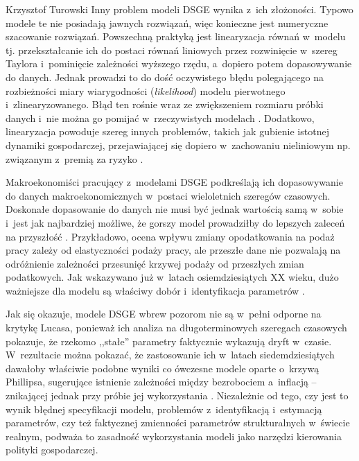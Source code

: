 \begin{artplenv}{Krzysztof Turowski}
Inny problem modeli DSGE wynika z~ich złożoności. Typowo modele te nie posiadają jawnych rozwiązań, więc konieczne jest
numeryczne szacowanie rozwiązań. Powszechną praktyką jest linearyzacja równań w~modelu tj. przekształcanie ich do
postaci równań liniowych przez rozwinięcie w~szereg Taylora i~pominięcie zależności wyższego rzędu, a~dopiero potem
dopasowywanie do danych. Jednak prowadzi to do dość oczywistego błędu polegającego na rozbieżności
miary wiarygodności (\textit{likelihood}) modelu pierwotnego i~zlinearyzowanego. Błąd ten rośnie wraz ze zwiększeniem
rozmiaru próbki danych i~nie można go pomijać w~rzeczywistych modelach
\parencite{fernandezvillaverde_convergence_2006}.
Dodatkowo, linearyzacja powoduje szereg innych problemów, takich jak gubienie istotnej dynamiki
gospodarczej, przejawiającej się dopiero w~zachowaniu nieliniowym np. związanym z~premią za ryzyko
\parencite{dou_macroeconomic_2017}.

Makroekonomiści pracujący z~modelami DSGE podkreślają ich dopasowywanie do danych makroekonomicznych w~postaci
wieloletnich szeregów czasowych. Doskonałe dopasowanie do danych nie musi być jednak wartością samą w~sobie
i~jest jak najbardziej możliwe, że gorszy model prowadziłby do lepszych zaleceń na przyszłość
\parencite{kocherlakota_model_2007}.
Przykładowo, ocena wpływu zmiany opodatkowania na podaż pracy zależy od
elastyczności podaży pracy, ale przeszłe dane nie pozwalają na odróżnienie zależności przesunięć krzywej podaży od
przeszłych zmian podatkowych. Jak wskazywano już w~latach osiemdziesiątych XX wieku, dużo ważniejsze dla modelu są
właściwy dobór i~identyfikacja parametrów
\parencite{sims_macroeconomics_1980}.

Jak się okazuje, modele DSGE wbrew pozorom nie są w~pełni odporne na krytykę Lucasa, ponieważ ich analiza na
długoterminowych szeregach czasowych pokazuje, że rzekomo ,,stałe'' parametry faktycznie wykazują
dryft w~czasie. W~rezultacie można pokazać, że zastosowanie ich w~latach siedemdziesiątych dawałoby
właściwie podobne wyniki co ówczesne
modele oparte o~krzywą Phillipsa, sugerujące istnienie zależności między bezrobociem a~inflacją  --  znikającej
jednak przy próbie jej wykorzystania
\parencite{hurtado_dsge_2014}.
Niezależnie od tego, czy jest to wynik
błędnej specyfikacji modelu, problemów z~identyfikacją i~estymacją parametrów, czy też faktycznej zmienności parametrów
strukturalnych w~świecie realnym, podważa to zasadność wykorzystania modeli jako narzędzi kierowania polityki gospodarczej.


\end{artplenv}
